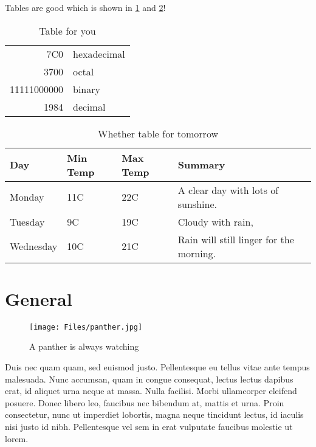 


Tables are good \cite{ATraveler} which is shown in \ref{table: you} and 
\ref{table: whether}!
\begin{table}[ht] 
    \centering 
    \begin{tabular}{|r|l|}
        \hline
        7C0 & hexadecimal \\
        3700 & octal \\ \cline{2-2}
        11111000000 & binary \\
        \hline \hline
        1984 & decimal \\
        \hline
    \end{tabular}
    \caption[You-table]{Table for you}
    \label{table: you} %
\end{table} 

\begin{table}[ht] 
    \centering 
    \begin{tabular}{ | l | l | l | p{5cm} |}
        \hline
        Day & Min Temp & Max Temp & Summary \\ \hline
        Monday & 11C & 22C & A clear day with lots of sunshine. \\ \hline
        Tuesday & 9C & 19C & Cloudy with rain, \\ \hline
        Wednesday & 10C & 21C & Rain will still linger for the morning.\\
        \hline
    \end{tabular}
    \caption[Weather table]{Whether table for tomorrow}
    \label{table: whether} 
\end{table} 

\section{General}

\begin{figure}
    \centering
    \texttt{[image: Files/panther.jpg]}
    \caption[The panther]{A panther is always watching}
    \label{fig: jordan}
\end{figure}

Duis nec quam quam, sed euismod justo. Pellentesque eu tellus vitae ante tempus malesuada. Nunc accumsan, quam in congue consequat, lectus lectus dapibus erat, id aliquet urna neque at massa. Nulla facilisi. Morbi ullamcorper eleifend posuere. Donec libero leo, faucibus nec bibendum at, mattis et urna. Proin consectetur, nunc ut imperdiet lobortis, magna neque tincidunt lectus, id iaculis nisi justo id nibh. Pellentesque vel sem in erat vulputate faucibus molestie ut lorem.


